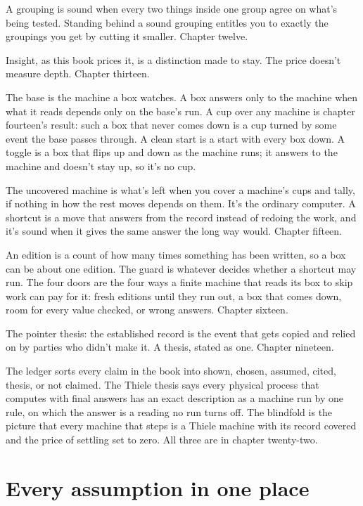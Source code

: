 \documentclass[11pt,twoside]{article}
\theoremstyle{thielethm}
\theoremstyle{thieledef}
\theoremstyle{thieledef}
\theoremstyle{thieledef}
\theoremstyle{thielethm}
\theoremstyle{thieleobs}
\theoremstyle{thielethm}
\begin{document}
A grouping is sound when every two things inside one group agree on what's being tested. Standing behind a sound grouping entitles you to exactly the groupings you get by cutting it smaller. Chapter twelve.

Insight, as this book prices it, is a distinction made to stay. The price doesn't measure depth. Chapter thirteen.

The base is the machine a box watches. A box answers only to the machine when what it reads depends only on the base's run. A cup over any machine is chapter fourteen's result: such a box that never comes down is a cup turned by some event the base passes through. A clean start is a start with every box down. A toggle is a box that flips up and down as the machine runs; it answers to the machine and doesn't stay up, so it's no cup.

The uncovered machine is what's left when you cover a machine's cups and tally, if nothing in how the rest moves depends on them. It's the ordinary computer. A shortcut is a move that answers from the record instead of redoing the work, and it's sound when it gives the same answer the long way would. Chapter fifteen.

An edition is a count of how many times something has been written, so a box can be about one edition. The guard is whatever decides whether a shortcut may run. The four doors are the four ways a finite machine that reads its box to skip work can pay for it: fresh editions until they run out, a box that comes down, room for every value checked, or wrong answers. Chapter sixteen.

The pointer thesis: the established record is the event that gets copied and relied on by parties who didn't make it. A thesis, stated as one. Chapter nineteen.

The ledger sorts every claim in the book into shown, chosen, assumed, cited, thesis, or not claimed. The Thiele thesis says every physical process that computes with final answers has an exact description as a machine run by one rule, on which the answer is a reading no run turns off. The blindfold is the picture that every machine that steps is a Thiele machine with its record covered and the price of settling set to zero. All three are in chapter twenty-two.

\section{Every assumption in one place}
\label{sec:assumptions}
\end{document}
